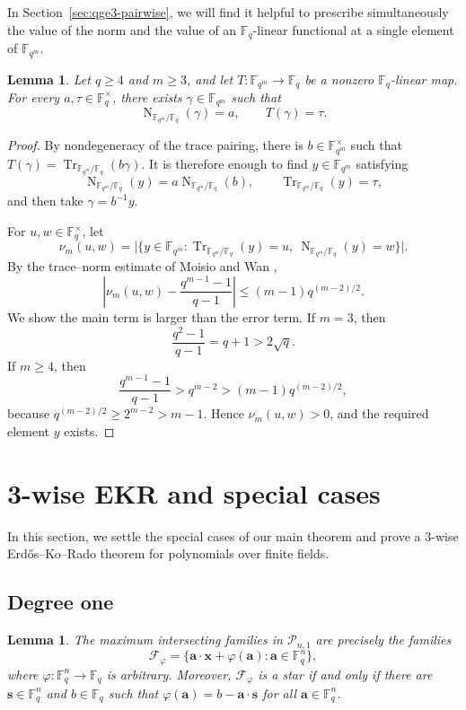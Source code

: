 \documentclass[12pt,reqno]{amsart}
\newtheorem{lem}[thm]{Lemma}
\theoremstyle{definition}
\newcommand{\Nm}{\operatorname{N}}
\newcommand{\Tr}{\operatorname{Tr}}
\newcommand{\F}{\mathbb{F}}
\newcommand{\cF}{\mathcal F}
\newcommand{\cP}{\mathcal P}
\begin{document}
In Section~\ref{sec:qge3-pairwise}, we will find it helpful to prescribe simultaneously the value of the norm and the value of an $\F_q$-linear functional at a single element of $\F_{q^m}$.

\begin{lem}\label{lem:prescribed-norm-linear}
Let $q\geq4$ and $m\geq3$, and let
$T\colon\F_{q^m}\to\F_q$ be a nonzero $\F_q$-linear map. For every
$a,\tau\in\F_q^\times$, there exists $\gamma\in\F_{q^m}$ such that
\[
  \Nm_{\F_{q^m}/\F_q}(\gamma)=a,
  \qquad
  T(\gamma)=\tau.
\]
\end{lem}

\begin{proof}
By nondegeneracy of the trace pairing, there is
$b\in\F_{q^m}^\times$ such that $T(\gamma)=\Tr_{\F_{q^m}/\F_q}(b\gamma)$. It is therefore enough to find $y\in\F_{q^m}$ satisfying
\[
  \Nm_{\F_{q^m}/\F_q}(y)
  =a\Nm_{\F_{q^m}/\F_q}(b), \qquad  \Tr_{\F_{q^m}/\F_q}(y)=\tau,
\]
and then take $\gamma=b^{-1}y$.

For $u,w\in\F_q^\times$, let
\[
  \nu_m(u,w)
  =\bigl|\{y\in\F_{q^m}:
      \Tr_{\F_{q^m}/\F_q}(y)=u,\ 
      \Nm_{\F_{q^m}/\F_q}(y)=w\}\bigr|.
\]
By the trace--norm estimate of Moisio and Wan
\cite[Theorem~1.2]{MW10},
\[
  \left|
    \nu_m(u,w)-\frac{q^{m-1}-1}{q-1}
  \right|
  \leq (m-1)q^{(m-2)/2}.
\]
We show the main term is larger than the error term. If $m=3$, then
\[
  \frac{q^2-1}{q-1}=q+1>2\sqrt q.
\]
If $m\geq4$, then
\[
  \frac{q^{m-1}-1}{q-1}
  >q^{m-2}
  >(m-1)q^{(m-2)/2},
\]
because $q^{(m-2)/2}\geq2^{m-2}>m-1$. Hence $\nu_m(u,w)>0$, and the required element $y$ exists.
\end{proof}

\section{3-wise EKR and special cases}
\label{sec:remaining-cases}

In this section, we settle the special cases of our main theorem and prove a 3-wise Erd\H{o}s--Ko--Rado theorem for polynomials over finite fields.

\subsection{Degree one}
\label{subsec:degree-one}

\begin{lem}\label{lem:degree-one}
The maximum intersecting families in $\cP_{n,1}$ are precisely the
families
\[
  \cF_\varphi
  =\{\mathbf a\cdot\mathbf x+\varphi(\mathbf a):
       \mathbf a\in\F_q^n\},
\]
where $\varphi\colon\F_q^n\to\F_q$ is arbitrary. Moreover,
$\cF_\varphi$ is a star if and only if there are
$\mathbf s\in\F_q^n$ and $b\in\F_q$ such that $\varphi(\mathbf a)=b-\mathbf a\cdot\mathbf s$ for all $\mathbf a\in\F_q^n$.
\end{lem}
\end{document}
